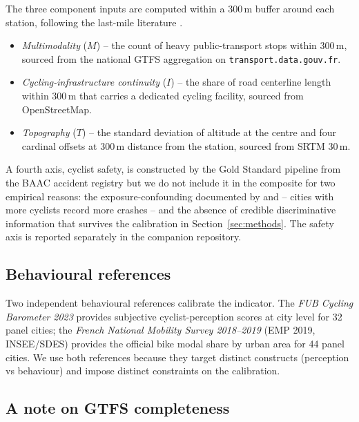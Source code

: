 \documentclass[11pt,a4paper]{article}
\begin{document}
The three component inputs are computed within a 300\,m buffer
around each station, following the last-mile literature
\citep{ElGeneidy2016, Saberi2018}.
\begin{itemize}
\item \emph{Multimodality} ($M$) -- the count of heavy
public-transport stops within 300\,m, sourced from the
national GTFS aggregation on \texttt{transport.data.gouv.fr}.
\item \emph{Cycling-infrastructure continuity} ($I$) -- the
share of road centerline length within 300\,m that carries a
dedicated cycling facility, sourced from OpenStreetMap.
\item \emph{Topography} ($T$) -- the standard deviation of
altitude at the centre and four cardinal offsets at 300\,m
distance from the station, sourced from SRTM 30\,m.
\end{itemize}
A fourth axis, cyclist safety, is constructed by the Gold
Standard pipeline from the BAAC accident registry but we do not
include it in the composite for two empirical reasons: the
exposure-confounding documented by \citet{Reynolds2009} and
\citet{Schepers2014} -- cities with more cyclists record more
crashes -- and the absence of credible discriminative
information that survives the calibration in
Section~\ref{sec:methods}. The safety axis is reported
separately in the companion repository.

\subsection{Behavioural references}

Two independent behavioural references calibrate the
indicator. The \emph{FUB Cycling Barometer 2023} provides
subjective cyclist-perception scores at city level for 32 panel
cities; the \emph{French National Mobility Survey 2018--2019}
(EMP 2019, INSEE/SDES) provides the official bike modal share
by urban area for 44 panel cities. We use both references
because they target distinct constructs (perception vs
behaviour) and impose distinct constraints on the calibration.

\subsection{A note on GTFS completeness}
\label{sec:val-a6}
\end{document}
